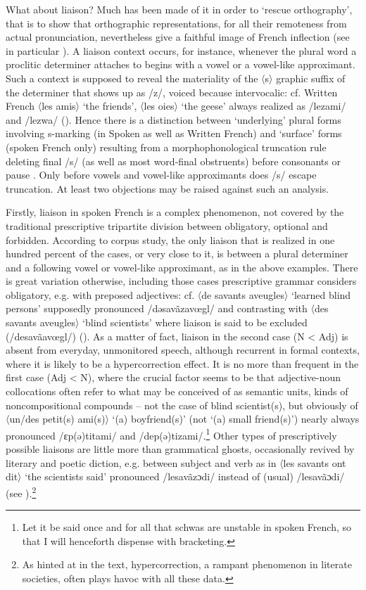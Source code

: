 \documentclass[output=paper]{langscibook}
\begin{document}
What about liaison? Much has been made of it in order to ‘rescue orthography’, that is to show that orthographic representations, for all their remoteness from actual pronunciation, nevertheless give a faithful image of French inflection (see in particular \citealt{Dell1973, Huot2005}). A liaison context occurs, for instance, whenever the plural word a proclitic determiner attaches to begins with a vowel or a vowel-like approximant. Such a context is supposed to reveal the materiality of the 〈s〉 graphic suffix of the determiner that shows up as /z/, voiced because intervocalic: cf. Written French 〈les amis〉 ‘the friends’, 〈les oies〉 ‘the geese’ always realized as /lezami/ and /lezwa/ (\citealt[134--136]{Huot2005}). Hence there is a distinction between ‘underlying’ plural forms involving s-marking (in Spoken as well as Written French) and ‘surface’ forms  (spoken French only) resulting from a morphophonological truncation rule deleting final /s/ (as well as most word-final obstruents) before consonants or pause \citep[181--182]{Dell1973}. Only before vowels and vowel-like approximants does /s/ escape truncation. At least two objections may be raised against such an analysis.

Firstly, liaison in spoken French is a complex phenomenon, not covered by the traditional prescriptive tripartite division between obligatory, optional and forbidden. According to  corpus study, the only liaison that is realized in one hundred percent of the cases, or very close to it, is between a plural determiner and a following vowel or vowel-like approximant, as in the above examples. There is great variation otherwise, including those cases prescriptive grammar considers obligatory, e.g. with preposed adjectives: cf. 〈de savants aveugles〉 ‘learned blind persons’ supposedly pronounced /dəsavãzavœgl/ and contrasting with 〈des savants aveugles〉 ‘blind scientists’ where liaison is said to be excluded (/desavãavœgl/) (\citealt[51]{MilnerRegnault1987}). As a matter of fact, liaison in the second case (N < Adj) is absent from everyday, unmonitored speech, although recurrent in formal contexts, where it is likely to be a hypercorrection effect. It is no more than frequent in the first case (Adj < N), where the crucial factor seems to be that adjective-noun collocations often refer to what may be conceived of as semantic units, kinds of noncompositional compounds -- not the case of blind scientist(s), but obviously of 〈un/des petit(s) ami(s)〉 ‘(a) boyfriend(s)’ (not ‘(a) small friend(s)’) nearly always pronounced /ɛp(ə)titami/ and /dep(ə)tizami/.\footnote{Let it be said once and for all that schwas are unstable in spoken French, so that I will henceforth dispense with bracketing.} Other types of prescriptively possible liaisons are little more than grammatical ghosts, occasionally revived by literary and poetic diction, e.g. between subject and verb as in 〈les savants ont dit〉 ‘the scientists said’ pronounced /lesavãzɔdi/ instead of (usual) /lesavãɔdi/ (see \citealt[51]{MilnerRegnault1987}).\footnote{As hinted at in the text, hypercorrection, a rampant phenomenon in literate societies, often plays havoc with all these data.}
\end{document}
